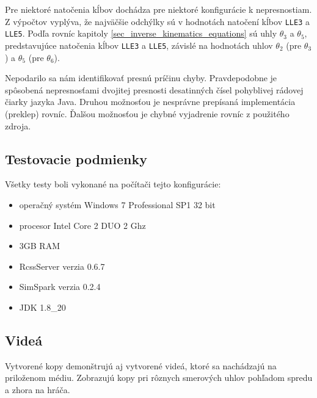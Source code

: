 Pre niektoré natočenia kĺbov dochádza pre niektoré konfigurácie k nepresnostiam. Z výpočtov vyplýva, že najväčšie odchýlky sú v hodnotách natočení kĺbov \texttt{LLE3} a \texttt{LLE5}. Podľa rovníc kapitoly \ref{sec_inverse_kinematics_equations} sú uhly $\theta_3$ a $\theta_5$, predstavujúce natočenia kĺbov \texttt{LLE3} a \texttt{LLE5}, závislé na hodnotách uhlov $\theta_2$ (pre $\theta_3$) a $\theta_5$ (pre $\theta_6$).

Nepodarilo sa nám identifikovať presnú príčinu chyby. Pravdepodobne je spôsobená nepresnosťami dvojitej presnosti desatinných čísel pohyblivej rádovej čiarky jazyka Java. Druhou možnosťou je nesprávne prepísaná implementácia (preklep) rovníc. Ďalšou možnosťou je chybné vyjadrenie rovníc z použitého zdroja.

\subsection{Testovacie podmienky}
Všetky testy boli vykonané na počítači tejto konfigurácie:
\begin{itemize}
	\item operačný systém Windows 7 Professional SP1 32 bit
	\item procesor Intel Core 2 DUO 2 Ghz
	\item 3GB RAM
	\item RcssServer verzia 0.6.7
	\item SimSpark verzia 0.2.4
	\item JDK 1.8\_20 
\end{itemize}

\subsection{Videá}
Vytvorené kopy demonštrujú aj vytvorené videá, ktoré sa nachádzajú na priloženom médiu. Zobrazujú kopy pri rôznych smerových uhlov pohľadom spredu a zhora na hráča.


